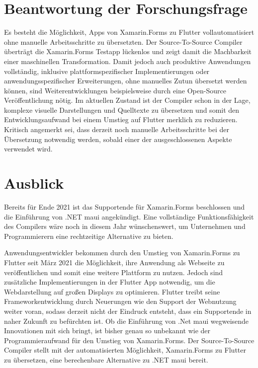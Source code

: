 \section{Beantwortung der Forschungsfrage}
Es besteht die Möglichkeit,  Apps von Xamarin.Forms zu Flutter vollautomatisiert ohne manuelle 
Arbeitsschritte zu übersetzten.  Der Source-To-Source Compiler überträgt die Xamarin.Forms Testapp lückenlos und zeigt damit die Machbarkeit einer maschinellen Transformation.   Damit jedoch auch produktive Anwendungen vollständig, inklusive plattformspezifischer Implementierungen oder anwendungsspezifischer Erweiterungen, ohne manuelles Zutun übersetzt werden können,  sind 
Weiterentwicklungen beispielsweise durch eine Open-Source Veröffentlichung nötig.
Im aktuellen Zustand ist der Compiler schon in der Lage,  komplexe visuelle Darstellungen
und Quelltexte zu übersetzen und somit den Entwicklungsaufwand bei einem Umstieg auf Flutter 
merklich zu reduzieren.
Kritisch angemerkt sei,  dass derzeit noch manuelle Arbeitsschritte bei der Übersetzung notwendig werden,  sobald einer der ausgeschlossenen Aspekte verwendet wird.


\section{Ausblick}
Bereits für Ende 2021 ist das Supportende für Xamarin.Forms beschlossen und die Einführung von 
.NET \ac{maui} angekündigt.  Eine vollständige Funktionsfähigkeit des Compilers wäre noch in diesem Jahr wünschenswert,  um Unternehmen und Programmierern eine rechtzeitige Alternative zu bieten. 

Anwendungsentwickler bekommen durch den Umstieg von Xamarin.Forms zu Flutter seit März 2021 die Möglichkeit,  ihre Anwendung als Webseite zu veröffentlichen und somit eine weitere Plattform zu nutzen.  Jedoch sind zusätzliche Implementierungen in der Flutter App notwendig,  um die Webdarstellung auf großen Displays zu optimieren.  Flutter treibt seine Frameworkentwicklung durch Neuerungen wie den Support der Webnutzung weiter voran,  sodass derzeit nicht der 
Eindruck entsteht, dass ein Supportende in naher Zukunft zu befürchten ist. 
Ob die Einführung von .Net \ac{maui} wegweisende Innovationen mit sich bringt,  ist bisher genau so unbekannt wie der Programmieraufwand für den Umstieg von Xamarin.Forms.  Der Source-To-Source Compiler stellt mit der automatisierten Möglichkeit,  Xamarin.Forms zu Flutter zu übersetzen,  eine berechenbare Alternative zu .NET \ac{maui} bereit.